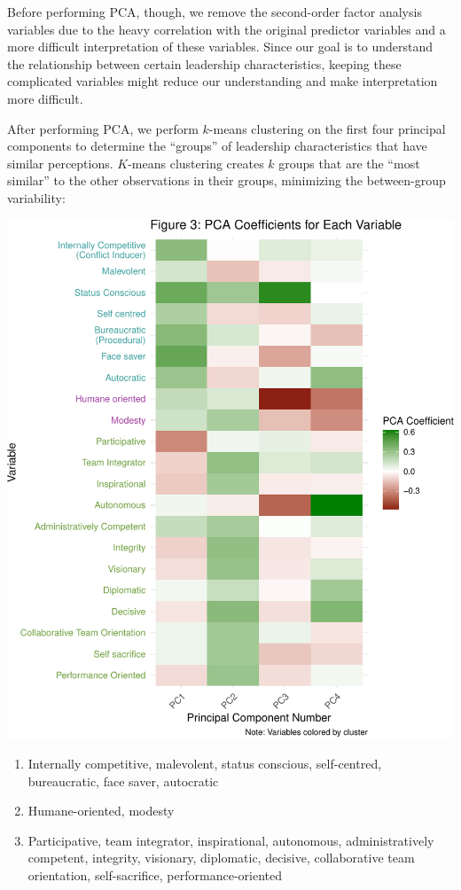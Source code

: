 \documentclass[
]{article}
\providecommand{\tightlist}{%
  \setlength{\itemsep}{0pt}\setlength{\parskip}{0pt}}
\begin{document}
Before performing PCA, though, we remove the second-order factor
analysis variables due to the heavy correlation with the original
predictor variables and a more difficult interpretation of these
variables. Since our goal is to understand the relationship between
certain leadership characteristics, keeping these complicated variables
might reduce our understanding and make interpretation more difficult.

After performing PCA, we perform \(k\)-means clustering on the first
four principal components to determine the ``groups'' of leadership
characteristics that have similar perceptions. \(K\)-means clustering
creates \(k\) groups that are the ``most similar'' to the other
observations in their groups, minimizing the between-group variability:

\begin{center}\includegraphics[width=0.85\linewidth]{globe_report_files/figure-latex/pca_heatmap-1} \end{center}


\begin{enumerate}
\def\labelenumi{\arabic{enumi}.}
\tightlist
\item
  \textcolor{clust1}{Internally competitive, malevolent, status conscious, self-centred, bureaucratic, face saver, autocratic}
\item
  \textcolor{clust2}{Humane-oriented, modesty}
\item
  \textcolor{clust3}{Participative, team integrator, inspirational, autonomous, administratively competent, integrity, visionary, diplomatic, decisive, collaborative team orientation, self-sacrifice, performance-oriented}
\end{enumerate}
\end{document}
